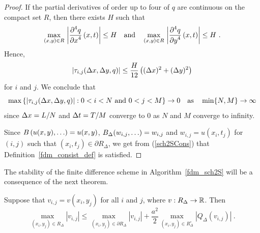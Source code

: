 \begin{proof}
If the partial derivatives of order up to four of $q$ are continuous on the
compact set $R$, then there exists $H$ such that
\[
\max_{(x,y)\in R}\, \left|\frac{\displaystyle \partial^{4}{q}} {\displaystyle \partial{x}^{4}}\left(x,t\right) \right| \leq
H \quad \text{and} \quad 
\max_{(x,y)\in R}\, \left|\frac{\displaystyle \partial^{4}{q}} {\displaystyle \partial{y}^{4}}\left(x,t\right) \right| \leq
H \ .
\]
Hence,
\begin{equation} \label{fdm_sch2STrunc}
\left| \tau_{i,j}(\Delta{x},\Delta{y},q) \right | \leq
\frac{H}{12} \left( (\Delta{x})^2 + (\Delta{y})^2\right)
\end{equation}
for $i$ and $j$.  We conclude that
\begin{equation} \label{sch2SCons}
\max \left\{ \left|\tau_{i,j}(\Delta{x},\Delta{y},q)\right| :
0<i<N \ \text{and} \ 0 < j < M
\right\} \rightarrow 0 \quad \text{as} \quad \min \{N, M\} \rightarrow \infty
\end{equation}
since $\Delta{x} = L/N$ and $\Delta{t} = T/M$ converge to $0$ as $N$ and
$M$ converge to infinity.

Since $\displaystyle B\left(u(x,y), \ldots \right) = u(x,y)$,
$\displaystyle B_\Delta(w_{i,j},\ldots) = w_{i,j}$ and $w_{i,j} = u(x_i,t_j)$
for $(i,j)$ such that $(x_i,t_j) \in \partial R_\Delta$, we get from 
(\ref{sch2SCons}) that Definition~\ref{fdm_consist_def} is satisfied.
\end{proof}

The stability of the finite difference scheme in
Algorithm~\ref{fdm_sch2S} will be a consequence of the next theorem.

\begin{theorem} \label{LaplaceVdeltaVInequ}
Suppose that $v_{i,j} = v(x_i,y_j)$ for all $i$ and $j$, where
$v:R_\Delta \to \mathbb{R}$.  Then
\[
\max_{(x_i,y_j) \in R_\Delta} |v_{i,j}|
\leq \max_{(x_i,y_j) \in \partial R_\Delta} |v_{i,j}|
+ \frac{a^2}{2} \max_{(x_i,y_j) \in R^\circ_\Delta}
\left|Q_\Delta(v_{i,j})\right| \ .
\]
\end{theorem}

